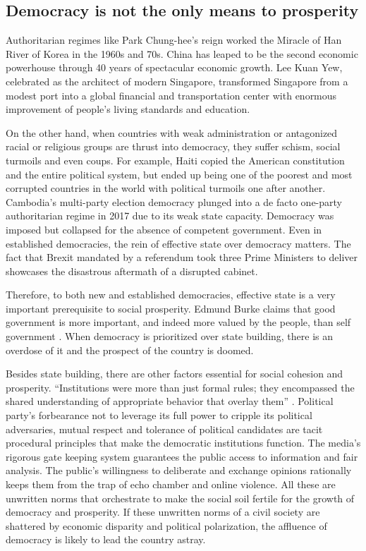 \documentclass{scrartcl}
\theoremstyle{definition}
\begin{document}
\subsection{Democracy is not the only means to prosperity}

Authoritarian regimes like Park Chung-hee's reign worked the Miracle of Han River of Korea in the 1960s and 70s. China has leaped to be the second economic powerhouse through 40 years of spectacular economic growth. Lee Kuan Yew, celebrated as the architect of modern Singapore, transformed Singapore from a modest port into a global financial and transportation center with enormous improvement of people's living standards and education. 

On the other hand, when countries with weak administration or antagonized racial or religious groups are thrust into democracy, they suffer schism, social turmoils and even coups. For example, Haiti copied the American constitution and the entire political system, but ended up being one of the poorest and most corrupted countries in the world with political turmoils one after another. Cambodia’s multi-party election democracy plunged into a de facto one-party authoritarian regime in 2017 due to its weak state capacity. Democracy was imposed but collapsed for the absence of competent government. Even in established democracies, the rein of effective state over democracy matters. The fact that Brexit mandated by a referendum took three Prime Ministers to deliver showcases the disastrous aftermath of a disrupted cabinet. 

Therefore, to both new and established democracies, effective state is a very important prerequisite to social prosperity. Edmund Burke claims that good government is more important, and indeed more valued by the people, than self government \autocite[70]{scand}. When democracy is prioritized over state building, there is an overdose of it and the prospect of the country is doomed. 

Besides state building, there are other factors essential for social cohesion and prosperity. ``Institutions were more than just formal rules; they encompassed the shared understanding of appropriate behavior that overlay them'' \autocite[213]{demdie}. Political party's forbearance not to leverage its full power to cripple its political adversaries, mutual respect and tolerance of political candidates are tacit procedural principles that make the democratic institutions function. The media's rigorous gate keeping system guarantees the public access to information and fair analysis. The public's willingness to deliberate and exchange opinions rationally keeps them from the trap of echo chamber and online violence. All these are unwritten norms that orchestrate to make the social soil fertile for the growth of democracy and prosperity. If these unwritten norms of a civil society are shattered by economic disparity and political polarization, the affluence of democracy is likely to lead the country astray. 
\end{document}
